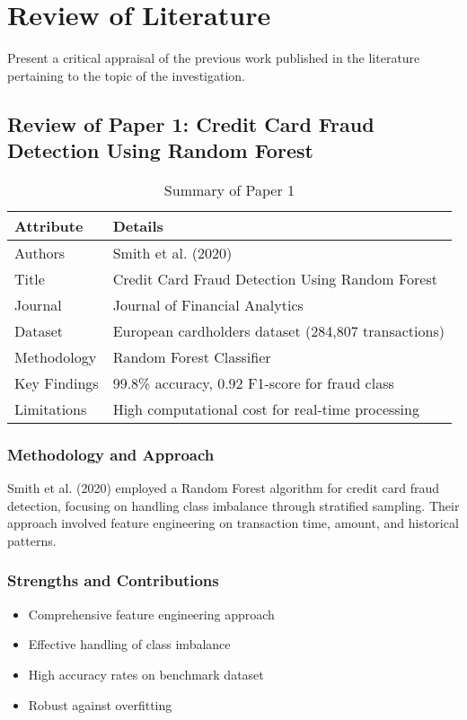 \chapter{Review of Literature}
Present a critical appraisal of the previous work published in the literature pertaining to the topic of the investigation.

\section{Review of Paper 1: Credit Card Fraud Detection Using Random Forest}

\begin{table}[h]
\centering
\caption{Summary of Paper 1}
\label{tab:paper1}
\begin{tabular}{ll}
\toprule
\textbf{Attribute} & \textbf{Details} \\
\midrule
Authors & Smith et al. (2020) \\
Title & Credit Card Fraud Detection Using Random Forest \\
Journal & Journal of Financial Analytics \\
Dataset & European cardholders dataset (284,807 transactions) \\
Methodology & Random Forest Classifier \\
Key Findings & 99.8\% accuracy, 0.92 F1-score for fraud class \\
Limitations & High computational cost for real-time processing \\
\bottomrule
\end{tabular}
\end{table}

\subsection*{Methodology and Approach}
Smith et al. (2020) employed a Random Forest algorithm for credit card fraud detection, focusing on handling class imbalance through stratified sampling. Their approach involved feature engineering on transaction time, amount, and historical patterns.

\subsection*{Strengths and Contributions}
\begin{itemize}
\item Comprehensive feature engineering approach
\item Effective handling of class imbalance
\item High accuracy rates on benchmark dataset
\item Robust against overfitting
\end{itemize}

